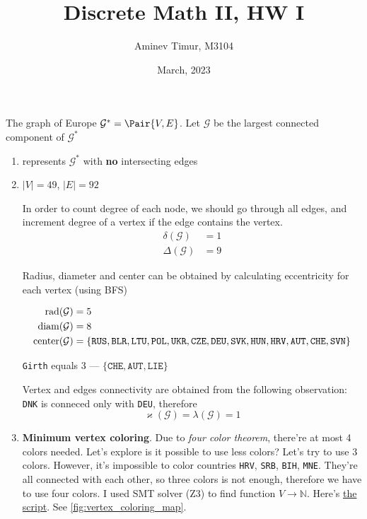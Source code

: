 \documentclass[12pt, a4paper]{article}
\title{Discrete Math II, HW I}
\date{March, 2023}
\author{Aminev Timur, M3104}
\newcommand\EGraph{\mathcal{G}^{*}}
\newcommand\EGraphL{\mathcal{G}}
\begin{document}
\maketitle

\problem The graph of Europe \(\EGraph = \Pair{V, E}\). Let \(\EGraphL\) be the
largest connected component of \(\EGraph\)

\begin{enumerate}[label=\alph*)]
\item {} represents \(\EGraph\) with \textbf{no} intersecting
edges
\item \(|V| = 49\), \(|E| = 92\)

In order to count degree of each node, we should go through all edges, and
increment degree of a vertex if the edge contains the vertex. %
\begin{align*}
\delta(\EGraphL) &= 1 \\
\Delta(\EGraphL) &= 9
\end{align*}

Radius, diameter and center can be obtained by calculating eccentricity for
each vertex (using BFS)

\begin{align*}
\rad(\EGraphL) &= 5 \\
\diam(\EGraphL) &= 8 \\
\mycenter(\EGraphL) &= \{\texttt{RUS}, \texttt{BLR}, \texttt{LTU}, \texttt{POL}, \texttt{UKR}, \texttt{CZE}, \texttt{DEU}, \texttt{SVK}, \texttt{HUN}, \texttt{HRV}, \texttt{AUT}, \texttt{CHE}, \texttt{SVN}\}
\end{align*}

\texttt{Girth} equals 3 --- \(\{\texttt{CHE}, \texttt{AUT}, \texttt{LIE}\}\)

Vertex and edges connectivity are obtained from the following observation:
\texttt{DNK} is conneced only with \texttt{DEU}, therefore
\[\varkappa(\EGraphL) = \lambda(\EGraphL) = 1\]

\item \textbf{Minimum vertex coloring}. Due to \textit{four color theorem},
there're at most 4 colors needed. Let's explore is it possible to use less
colors? Let's try to use 3 colors. However, it's impossible to color countries
\texttt{HRV}, \texttt{SRB}, \texttt{BIH}, \texttt{MNE}. They're all connected
with each other, so three colors is not enough, therefore we have to use four
colors. I used SMT solver (Z3) to find function \(V \to \mathbb{N}\). Here's
\href{https://github.com/ablearthy-itmo-39828cf299f04949c86/discrete-math-2-hw-1/blob/753891b/auto/vertex_coloring.py}{the
script}. See \cref{fig:vertex_coloring_map}.


\end{enumerate}
\end{document}
